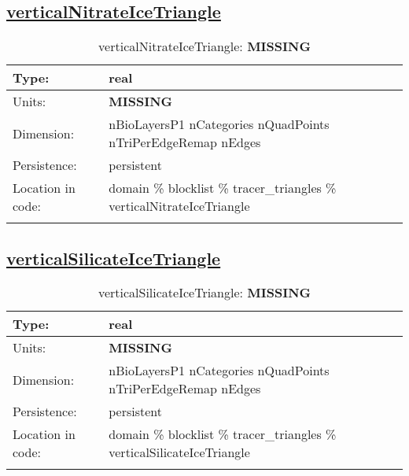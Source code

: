 \subsection[verticalNitrateIceTriangle]{\hyperref[sec:var_tab_tracer_triangles]{verticalNitrateIceTriangle}}
\label{subsec:var_sec_tracer_triangles_verticalNitrateIceTriangle}
\begin{center}
\begin{longtable}{| p{2.0in} | p{4.0in} |}
        \hline 
        Type: & real \\
        \hline 
        Units: & {\bf \color{red} MISSING} \\
        \hline 
        Dimension: & nBioLayersP1 nCategories nQuadPoints nTriPerEdgeRemap nEdges \\
        \hline 
        Persistence: & persistent \\
        \hline 
         Location in code: & domain \% blocklist \% tracer\_triangles \% verticalNitrateIceTriangle \\
         \hline 
    \caption{verticalNitrateIceTriangle: {\bf \color{red} MISSING}}
\end{longtable}
\end{center}
\subsection[verticalSilicateIceTriangle]{\hyperref[sec:var_tab_tracer_triangles]{verticalSilicateIceTriangle}}
\label{subsec:var_sec_tracer_triangles_verticalSilicateIceTriangle}
\begin{center}
\begin{longtable}{| p{2.0in} | p{4.0in} |}
        \hline 
        Type: & real \\
        \hline 
        Units: & {\bf \color{red} MISSING} \\
        \hline 
        Dimension: & nBioLayersP1 nCategories nQuadPoints nTriPerEdgeRemap nEdges \\
        \hline 
        Persistence: & persistent \\
        \hline 
         Location in code: & domain \% blocklist \% tracer\_triangles \% verticalSilicateIceTriangle \\
         \hline 
    \caption{verticalSilicateIceTriangle: {\bf \color{red} MISSING}}
\end{longtable}
\end{center}
